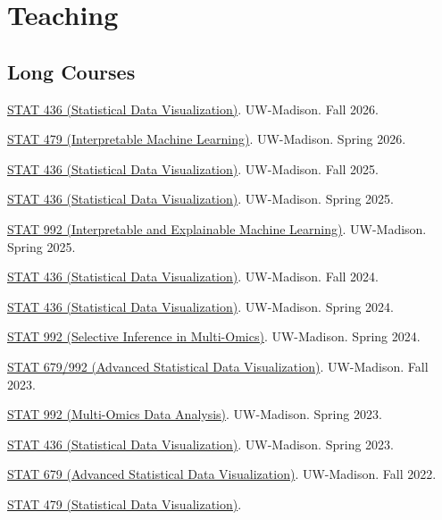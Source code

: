 \documentclass[letterpaper]{article}
\renewenvironment{itemize}{
  \begin{list}{}{
    \setlength{\leftmargin}{1.5em}
  }
}{
  \end{list}
}
\begin{document}
\section*{Teaching}

\subsection*{Long Courses}

\begin{itemize}
\item \href{https://github.com/krisrs1128/data_visualization_notes}{STAT 436 (Statistical Data Visualization)}. UW-Madison. Fall 2026.
\item \href{https://github.com/krisrs1128/stat479_notes}{STAT 479 (Interpretable Machine Learning)}. UW-Madison. Spring 2026.
\item \href{https://krisrs1128.github.io/stat436_notes/}{STAT 436 (Statistical Data Visualization)}. UW-Madison. Fall 2025.
\item \href{https://krisrs1128.github.io/stat436_s25/}{STAT 436 (Statistical Data Visualization)}. UW-Madison. Spring 2025.
\item \href{https://github.com/krisrs1128/stat992_s25}{STAT 992 (Interpretable and Explainable Machine Learning)}. UW-Madison. Spring 2025.
\item \href{https://krisrs1128.github.io/stat436_f24/}{STAT 436 (Statistical Data Visualization)}. UW-Madison. Fall 2024.
\item \href{https://krisrs1128.github.io/stat436_s24/}{STAT 436 (Statistical Data Visualization)}.  UW-Madison. Spring 2024.
\item \href{https://github.com/krisrs1128/stat992_s24}{STAT 992 (Selective Inference in Multi-Omics)}. UW-Madison. Spring 2024.
\item \href{https://krisrs1128.github.io/stat992_f23/}{STAT 679/992 (Advanced Statistical Data Visualization)}.
UW-Madison. Fall 2023.
\item \href{https://krisrs1128.github.io/stat992_s23/}{STAT 992 (Multi-Omics Data Analysis)}.
UW-Madison. Spring 2023.
\item \href{https://krisrs1128.github.io/stat436_s23/}{STAT 436 (Statistical Data Visualization)}.
UW-Madison. Spring 2023.
\item \href{https://krisrs1128.github.io/stat679_notes/}{STAT 679 (Advanced Statistical Data Visualization)}.
UW-Madison. Fall 2022.
\item \href{https://github.com/krisrs1128/stat479_s22}{STAT 479 (Statistical Data Visualization)}.

\end{itemize}
\end{document}
